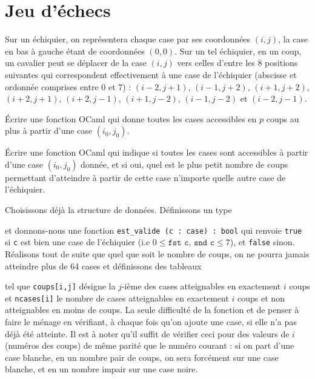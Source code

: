 \renewcommand{\SourceFile}{1-parcours-de-tableaux/src/1-1.ml}

\section{Jeu d'échecs}

Sur un échiquier, on représentera chaque case par ses coordonnées $(i, j)$, la case en bas à gauche étant de coordonnées $(0, 0)$. Sur un tel échiquier, en un coup, un cavalier peut se déplacer de la case $(i, j)$ vers celles d'entre les 8 positions suivantes qui correspondent effectivement à une case de l'échiquier (abscisse et ordonnée comprises entre 0 et 7) : $(i-2, j+1)$, $(i-1, j+2)$, $(i+1, j+2)$, $(i+2, j+1)$, $(i+2, j -1)$, $(i+1, j-2)$, $(i-1, j-2)$ et $(i-2,j-1)$.

\Q
Écrire une fonction OCaml qui donne toutes les cases accessibles en $p$ coups au plus à partir d'une case $(i_0, j_0)$.

\Q
Écrire une fonction OCaml qui indique si toutes les cases sont accessibles à partir d'une case $(i_0, j_0)$ donnée, et si oui, quel est le plus petit nombre de coups permettant d'atteindre à partir de cette case n'importe quelle autre case de l'échiquier.

\Corrige

\Q
Choisissons déjà la structure de données. Définissons un type



et donnons-nous une fonction \texttt{est\_valide (c : case) : bool} qui renvoie \texttt{true} si \texttt{c} est bien une case de l'échiquier (i.e $0\leq \texttt{fst c}$, $\texttt{snd c} \leq 7$), et \texttt{false} sinon. Réalisons tout de suite que quel que soit le nombre de coups, on ne pourra jamais atteindre plus de 64 cases et définissons des tableaux



tel que \texttt{coups[i,j]} désigne la $j$-ième des cases atteignables en exactement $i$ coups et \texttt{ncases[i]} le nombre de cases atteignables en exactement $i$ coups et non atteignables en moins de coups. La seule difficulté de la fonction et de penser à \og faire le ménage \fg en vérifiant, à chaque fois qu'on ajoute une case, si elle n'a pas déjà été atteinte. Il est à noter qu'il suffit de vérifier ceci pour des valeurs de $i$ (numéros des coups) de même parité que le numéro courant : si on part d'une case blanche, en un nombre pair de coups, on sera forcément sur une case blanche, et en un nombre impair sur une case noire.

